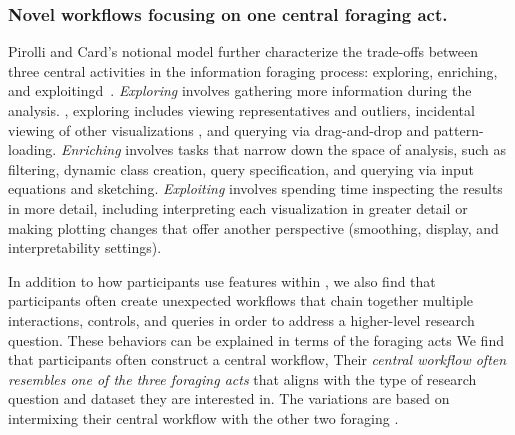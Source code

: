 \subsubsection{Novel workflows focusing on one central foraging act.}\label{novel_workflow_foraging}
\par Pirolli and Card's notional model further characterize the trade-offs between three central activities in the information foraging process: exploring, enriching, and exploitingd~\cite{Pirolli}. \textit{Exploring} involves gathering more information during the analysis. , exploring includes viewing representatives and outliers, incidental viewing of other visualizations , and querying via drag-and-drop and pattern-loading. \textit{Enriching} involves tasks that narrow down the space of analysis, such as filtering, dynamic class creation, query specification, and querying via input equations and sketching. \textit{Exploiting} involves spending time inspecting the results in more detail, including interpreting each visualization in greater detail or making plotting changes that offer another perspective (smoothing, display, and interpretability settings). %
\par In addition to  how participants use features within , we also find that participants often create unexpected workflows that chain together multiple  interactions, controls, and queries in order to address a higher-level research question. These behaviors can be explained in terms of the foraging acts  We find that participants often construct a central workflow,   Their \emph{central workflow often resembles one of the three foraging acts} that aligns with the type of research question and dataset they are interested in. The variations are based on intermixing their central workflow with the other two foraging .
